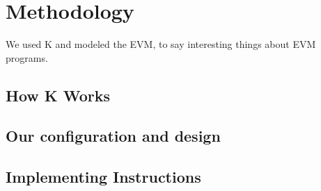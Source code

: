 \section{Methodology}
We used K and modeled the EVM, to say interesting things about EVM programs.
\subsection{How K Works}
\subsection{Our configuration and design}
\subsection{Implementing Instructions}

